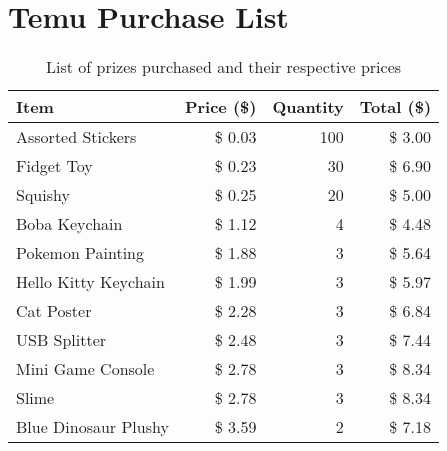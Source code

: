 \section{Temu Purchase List}
\label{appendix:temu}

\begin{table}[H]
	\centering
	\caption{List of prizes purchased and their respective prices}
	\begin{tabular}{l|rrr}
	\textbf{Item}           & \multicolumn{1}{l}{\textbf{Price (\$)}} & \multicolumn{1}{l}{\textbf{Quantity}} & \multicolumn{1}{l}{\textbf{Total (\$)}} \\ \hline
	Assorted Stickers       & \$ 0.03                                 & 100                                   & \$ 3.00                                 \\
	Fidget Toy              & \$ 0.23                                 & 30                                    & \$ 6.90                                 \\
	Squishy                 & \$ 0.25                                 & 20                                    & \$ 5.00                                 \\
	Boba Keychain           & \$ 1.12                                 & 4                                     & \$ 4.48                                 \\
	Pokemon Painting        & \$ 1.88                                 & 3                                     & \$ 5.64                                 \\
	Hello Kitty Keychain    & \$ 1.99                                 & 3                                     & \$ 5.97                                 \\
	Cat Poster              & \$ 2.28                                 & 3                                     & \$ 6.84                                 \\
	USB Splitter            & \$ 2.48                                 & 3                                     & \$ 7.44                                 \\
	Mini Game Console       & \$ 2.78                                 & 3                                     & \$ 8.34                                 \\
	Slime                   & \$ 2.78                                 & 3                                     & \$ 8.34                                 \\
	Blue Dinosaur Plushy    & \$ 3.59                                 & 2                                     & \$ 7.18                                 \\

\end{tabular}
\end{table}
